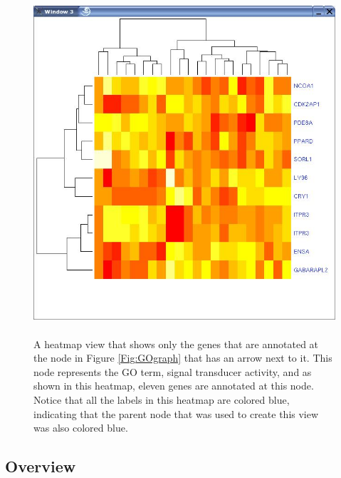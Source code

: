\documentclass[11pt]{article}
\begin{document}
\begin{figure}[ht]
  \begin{center}
    \includegraphics[height=5in, width=5in]{heatmapsub.jpg}
    \caption{ A heatmap view that shows only the genes that are annotated at
      the node in Figure \ref{Fig:GOgraph} that has an arrow next to it.  This
      node represents the GO term, signal transducer activity, and as shown in
      this heatmap, eleven genes are annotated at this node.  Notice that all
      the labels in this heatmap are colored blue, indicating that the parent
      node that was used to create this view was also colored blue.  
     }
    \label{Fig:heatmapsub}
  \end{center}
\end{figure}

\subsection*{Overview}
\end{document}
